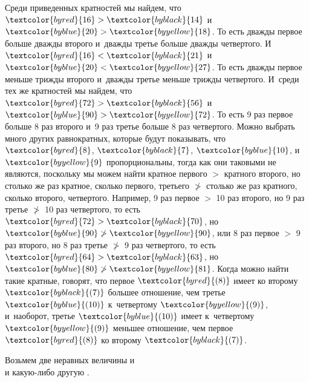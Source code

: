 \documentclass[letters,booklanguage=russian]{byrnebook}
\begin{document}
Среди приведенных кратностей мы найдем, что $\textcolor{byred}{16} > \textcolor{byblack}{14}$ и~$\textcolor{byblue}{20} > \textcolor{byyellow}{18}$. То есть дважды первое больше дважды второго и~дважды третье больше дважды четвертого. И~$\textcolor{byred}{16} < \textcolor{byblack}{21}$ и~$\textcolor{byblue}{20} < \textcolor{byyellow}{27}$. То есть дважды первое меньше трижды второго и~дважды третье меньше трижды четвертого. И~среди тех же кратностей мы найдем, что $\textcolor{byred}{72} > \textcolor{byblack}{56}$ и~$\textcolor{byblue}{90} > \textcolor{byyellow}{72}$. То есть 9 раз первое больше 8 раз второго и~9 раз третье больше 8 раз четвертого. Можно выбрать много других равнократных, которые будут показывать, что $\textcolor{byred}{8}$, $\textcolor{byblack}{7}$, $\textcolor{byblue}{10}$, и~$\textcolor{byyellow}{9}$ пропорциональны, тогда как они таковыми не являются, поскольку мы можем найти кратное первого $>$ кратного второго, но столько же раз кратное, сколько первого, третьего $\ngtr$ столько же раз кратного, сколько второго, четвертого. Например, 9 раз первое $>$ 10 раз второго, но 9 раз третье $\ngtr$ 10 раз четвертого, то есть $\textcolor{byred}{72} > \textcolor{byblack}{70}$, но $\textcolor{byblue}{90} \ngtr \textcolor{byyellow}{90}$, или 8 раз первое $>$ 9 раз второго, но 8 раз третье $\ngtr$ 9 раз четвертого, то есть $\textcolor{byred}{64} > \textcolor{byblack}{63}$, но $\textcolor{byblue}{80} \ngtr \textcolor{byyellow}{81}$. Когда можно найти такие кратные, говорят, что первое $\textcolor{byred}{(8)}$ имеет ко второму $\textcolor{byblack}{(7)}$ большее отношение, чем третье $\textcolor{byblue}{(10)}$ к~четвертому $\textcolor{byyellow}{(9)}$, и~наоборот, третье $\textcolor{byblue}{(10)}$ имеет к~четвертому $\textcolor{byyellow}{(9)}$ меньшее отношение, чем первое $\textcolor{byred}{(8)}$ ко второму $\textcolor{byblack}{(7)}$.

\vfill\pagebreak

\label{prop:V.VIII}

\begin{center}
Возьмем две неравных величины  и~\\
и какую-либо другую .
\end{center}
\end{document}

